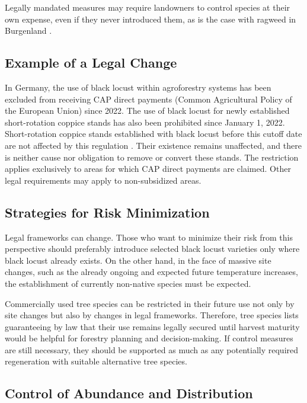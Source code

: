 Legally mandated measures may require landowners to control species at their own expense, even if they never introduced them, as is the case with ragweed in Burgenland \citep{burgenland2021ragweed}.

\subsection{Example of a Legal Change}%

In Germany, the use of black locust within agroforestry systems has been excluded from receiving CAP direct payments (Common Agricultural Policy of the European Union) since 2022. The use of black locust for newly established short-rotation coppice stands has also been prohibited since January 1, 2022. Short-rotation coppice stands established with black locust before this cutoff date are not affected by this regulation \citep{deLaw2022gap}. Their existence remains unaffected, and there is neither cause nor obligation to remove or convert these stands. The restriction applies exclusively to areas for which CAP direct payments are claimed. Other legal requirements may apply to non-subsidized areas.

\subsection{Strategies for Risk Minimization}

Legal frameworks can change. Those who want to minimize their risk from this perspective should preferably introduce selected black locust varieties only where black locust already exists. On the other hand, in the face of massive site changes, such as the already ongoing and expected future temperature increases, the establishment of currently non-native species must be expected.

Commercially used tree species can be restricted in their future use not only by site changes but also by changes in legal frameworks. Therefore, tree species lists guaranteeing by law that their use remains legally secured until harvest maturity would be helpful for forestry planning and decision-making. If control measures are still necessary, they should be supported as much as any potentially required regeneration with suitable alternative tree species.

\subsection{Control of Abundance and Distribution}

